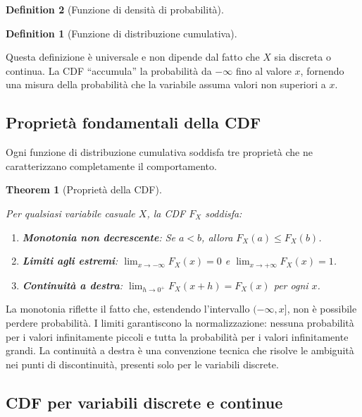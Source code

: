 \documentclass[
  letterpaper,
  DIV=11,
  numbers=noendperiod,
  oneside]{scrreprt}
\providecommand{\tightlist}{%
  \setlength{\itemsep}{0pt}\setlength{\parskip}{0pt}}
\theoremstyle{definition}
\theoremstyle{plain}
\newtheorem{theorem}{Theorem}[chapter]
\theoremstyle{definition}
\newtheorem{definition}{Definition}[chapter]
\theoremstyle{remark}
\begin{document}
\begin{definition}[Funzione di densità di
probabilità]
\begin{definition}[Funzione di distribuzione
cumulativa]
\end{definition}

Questa definizione è universale e non dipende dal fatto che \(X\) sia
discreta o continua. La CDF ``accumula'' la probabilità da \(-\infty\)
fino al valore \(x\), fornendo una misura della probabilità che la
variabile assuma valori non superiori a \(x\).

\subsection{Proprietà fondamentali della
CDF}\label{proprietuxe0-fondamentali-della-cdf}

Ogni funzione di distribuzione cumulativa soddisfa tre proprietà che ne
caratterizzano completamente il comportamento.

\begin{theorem}[Proprietà della
CDF]\protect\hypertarget{thm-cdf-properties-detail}{}\label{thm-cdf-properties-detail}

Per qualsiasi variabile casuale \(X\), la CDF \(F_X\) soddisfa:

\begin{enumerate}
\def\labelenumi{\arabic{enumi}.}
\tightlist
\item
  \textbf{Monotonia non decrescente}: Se \(a < b\), allora
  \(F_X(a) \leq F_X(b)\).
\item
  \textbf{Limiti agli estremi}: \(\lim_{x \to -\infty} F_X(x) = 0\) e
  \(\lim_{x \to +\infty} F_X(x) = 1\).
\item
  \textbf{Continuità a destra}: \(\lim_{h \to 0^+} F_X(x + h) = F_X(x)\)
  per ogni \(x\).
\end{enumerate}

\end{theorem}

La monotonia riflette il fatto che, estendendo l'intervallo
\((-\infty, x]\), non è possibile perdere probabilità. I limiti
garantiscono la normalizzazione: nessuna probabilità per i valori
infinitamente piccoli e tutta la probabilità per i valori infinitamente
grandi. La continuità a destra è una convenzione tecnica che risolve le
ambiguità nei punti di discontinuità, presenti solo per le variabili
discrete.

\subsection{CDF per variabili discrete e
continue}\label{cdf-per-variabili-discrete-e-continue}


\end{definition}
\end{document}
